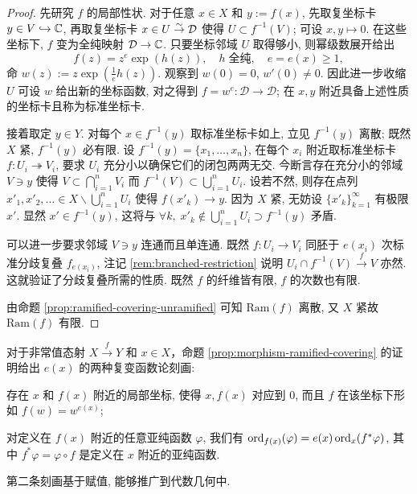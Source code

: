\begin{proof}
	先研究 $f$ 的局部性状. 对于任意 $x \in X$ 和 $y := f(x)$, 先取复坐标卡 $y \in V \hookrightarrow \mathbb{C}$, 再取复坐标卡 $x \in U \stackrel{\sim}{\rightarrow} \mathcal{D}$ 使得 $U \subset f^{-1}(V)$; 可设 $x,y \mapsto 0$. 在这些坐标下, $f$ 变为全纯映射 $\mathcal{D} \to \mathbb{C}$. 只要坐标邻域 $U$ 取得够小, 则幂级数展开给出
	\[ f(z) = z^e \exp(h(z)), \quad h \;\text{全纯}, \quad e = e(x) \geq 1, \]
	命 $w(z) := z\exp\left(\frac{1}{e} h(z)\right)$. 观察到 $w(0)=0$, $w'(0) \neq 0$. 因此进一步收缩 $U$ 可设 $w$ 给出新的坐标函数, 对之得到 $f = w^e: \mathcal{D} \to \mathcal{D}$; 在 $x,y$ 附近具备上述性质的坐标卡且称为标准坐标卡.

	接着取定 $y \in Y$. 对每个 $x \in f^{-1}(y)$ 取标准坐标卡如上, 立见 $f^{-1}(y)$ 离散; 既然 $X$ 紧, $f^{-1}(y)$ 必有限. 设 $f^{-1}(y) = \{x_1, \ldots, x_n \}$, 在每个 $x_i$ 附近取标准坐标卡 $f: U_i \twoheadrightarrow V_i$, 要求 $U_i$ 充分小以确保它们的闭包两两无交. 今断言存在充分小的邻域 $V \ni y$ 使得 $V \subset \bigcap_{i=1}^n V_i$ 而 $f^{-1}(V) \subset \bigcup_{i=1}^n U_i$. 设若不然, 则存在点列 $x'_1, x'_2, \ldots \in X \smallsetminus \bigcup_{i=1}^n U_i$ 使得 $f(x'_k) \to y$. 因为 $X$ 紧, 无妨设 $\{ x'_k \}_{k=1}^\infty$ 有极限 $x'$. 显然 $x' \in f^{-1}(y)$, 这将与 $\forall k, \; x'_k \notin \bigcup_{i=1}^n U_i \supset f^{-1}(y)$ 矛盾.
	
	可以进一步要求邻域 $V \ni y$ 连通而且单连通. 既然 $f: U_i \to V_i$ 同胚于 $e(x_i)$ 次标准分歧复叠 $f_{e(x_i)}$, 注记 \ref{rem:branched-restriction} 说明 $U_i \cap f^{-1}(V) \xrightarrow{f} V$ 亦然. 这就验证了分歧复叠所需的性质. 既然 $f$ 的纤维皆有限, $f$ 的次数也有限.

	由命题 \ref{prop:ramified-covering-unramified} 可知 $\text{Ram}(f)$ 离散, 又 $X$ 紧故 $\mathrm{Ram}(f)$ 有限.
\end{proof}

\begin{remark}\label{rem:ramification-index}
	对于非常值态射 $X \xrightarrow{f} Y$ 和 $x \in X$，命题 \ref{prop:morphism-ramified-covering} 的证明给出 $e(x)$ 的两种复变函数论刻画:
	\begin{compactitem}
		\item 存在 $x$ 和 $f(x)$ 附近的局部坐标, 使得 $x, f(x)$ 对应到 $0$, 而且 $f$ 在该坐标下形如 $f(w)=w^{e(x)}$;
		\item 对定义在 $f(x)$ 附近的任意亚纯函数 $\varphi$, 我们有 $\operatorname*{ord}_{f(x)}(\varphi) = e(x) \operatorname*{ord}_x(f^* \varphi)$, 其中 $f^* \varphi = \varphi \circ f$ 是定义在 $x$ 附近的亚纯函数.
	\end{compactitem}
	第二条刻画基于赋值, 能够推广到代数几何中.
\end{remark}

